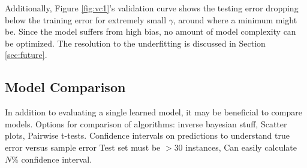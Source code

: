 Additionally, Figure \ref{fig:vc1}'s validation curve shows the testing error
dropping below the training error for extremely small $\gamma$, around where a
minimum might be.  Since the model suffers from high bias, no amount of model
complexity can be optimized. The resolution to the underfitting is discussed in
Section \ref{sec:future}.

\subsection{Model Comparison}
\label{sec:algcompare}

In addition to evaluating a single learned model, it may be beneficial to
compare models.  Options for comparison of algorithms: inverse bayesian stuff,
Scatter plots, Pairwise t-tests. Confidence intervals on predictions to
understand true error versus sample error Test set must be $> 30$ instances,
Can easily calculate $N\%$ confidence interval.

